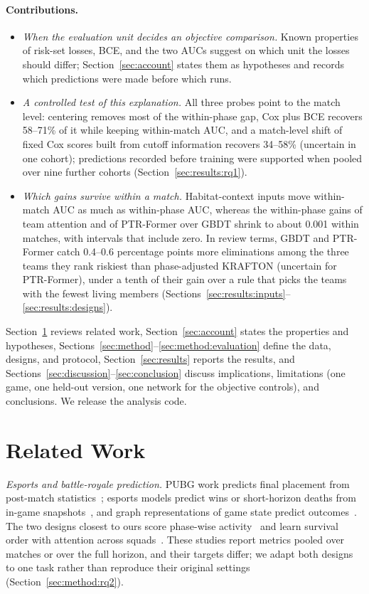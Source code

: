 \documentclass[sigconf,anonymous]{acmart}
\begin{document}
\paragraph{Contributions.}
\begin{itemize}
\item \emph{When the evaluation unit decides an objective comparison.} Known properties of risk-set losses, BCE, and the two AUCs suggest on which unit the losses should differ; Section~\ref{sec:account} states them as hypotheses and records which predictions were made before which runs.
\item \emph{A controlled test of this explanation.} All three probes point to the match level: centering removes most of the within-phase gap, Cox plus BCE recovers 58--71\% of it while keeping within-match AUC, and a match-level shift of fixed Cox scores built from cutoff information recovers 34--58\% (uncertain in one cohort); predictions recorded before training were supported when pooled over nine further cohorts (Section~\ref{sec:results:rq1}).
\item \emph{Which gains survive within a match.} Habitat-context inputs move within-match AUC as much as within-phase AUC, whereas the within-phase gains of team attention and of PTR-Former over GBDT shrink to about 0.001 within matches, with intervals that include zero. In review terms, GBDT and PTR-Former catch 0.4--0.6 percentage points more eliminations among the three teams they rank riskiest than phase-adjusted KRAFTON (uncertain for PTR-Former), under a tenth of their gain over a rule that picks the teams with the fewest living members (Sections~\ref{sec:results:inputs}--\ref{sec:results:designs}).
\end{itemize}
Section~\ref{sec:related} reviews related work, Section~\ref{sec:account} states the properties and hypotheses, Sections~\ref{sec:method}--\ref{sec:method:evaluation} define the data, designs, and protocol, Section~\ref{sec:results} reports the results, and Sections~\ref{sec:discussion}--\ref{sec:conclusion} discuss implications, limitations (one game, one held-out version, one network for the objective controls), and conclusions. We release the analysis code.

\section{Related Work}
\label{sec:related}
\emph{Esports and battle-royale prediction.} PUBG work predicts final placement from post-match statistics~\cite{KagglePUBG,LeeLee25}; esports models predict wins or short-horizon deaths from in-game snapshots~\cite{Hodge21,Katona19,Marshall22}, and graph representations of game state predict outcomes~\cite{Xenopoulos21}. The two designs closest to ours score phase-wise activity~\cite{Sagong25a} and learn survival order with attention across squads~\cite{KRAFTON}. These studies report metrics pooled over matches or over the full horizon, and their targets differ; we adapt both designs to one task rather than reproduce their original settings (Section~\ref{sec:method:rq2}).
\end{document}
